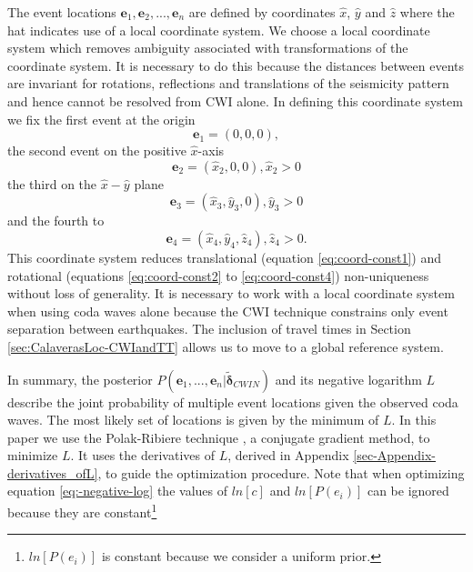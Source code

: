 \documentclass[extra, onecolumn, doublespacing]{gji}
\begin{document}
The event locations $\mathbf{e}_1, \mathbf{e}_2, ..., \mathbf{e}_n$
are defined by coordinates $\hat{x}$, $\hat{y}$ and $\hat{z}$ where
the hat indicates use of a local coordinate system. We choose a
local coordinate system which removes ambiguity associated with
transformations of the coordinate system. It is necessary to do this
because the distances between events are invariant for rotations,
reflections and translations of the seismicity pattern and hence
cannot be resolved from CWI alone. In defining this coordinate
system we fix the first event at the origin
\begin{equation}
\label{eq:coord-const1}
\mathbf{e}_1 = (0,0,0),
\end{equation}
the second event on the positive $\hat{x}$-axis
\begin{equation}
\label{eq:coord-const2}
\mathbf{e}_2 = (\hat{x}_2, 0, 0), \hat{x}_2>0
\end{equation}
the third on the $\hat{x}-\hat{y}$ plane
\begin{equation}
\label{eq:coord-const3}
\mathbf{e}_3 = (\hat{x}_3,\hat{y}_3,0), \hat{y}_3>0
\end{equation}
and the fourth to
\begin{equation}
\label{eq:coord-const4}
\mathbf{e}_4 = (\hat{x}_4,\hat{y}_4,\hat{z}_4), \hat{z}_4>0.
\end{equation}
This coordinate system reduces translational (equation \ref{eq:coord-const1})
and rotational (equations \ref{eq:coord-const2} to \ref{eq:coord-const4}) non-uniqueness
without loss of generality. It is necessary to work with a local coordinate
system when using coda waves alone because the CWI technique constrains only event separation
between earthquakes. The inclusion of travel times in Section \ref{sec:CalaverasLoc-CWIandTT}
allows us to move to a global reference system.

In summary, the posterior $P(\mathbf{e}_1,...,\mathbf{e}_n |
\widetilde{\mathbf{\delta}}_{CWIN})$ and its negative logarithm $L$
describe the joint probability of multiple event locations given the
observed coda waves. The most likely set of locations is given by
the minimum of $L$.   In this paper we use the Polak-Ribiere
technique \citep{dr_Press87a}, a conjugate gradient method, to
minimize $L$. It uses the derivatives of $L$, derived in Appendix
\ref{sec-Appendix-derivatives_ofL}, to guide the
optimization procedure. Note that when optimizing
equation \ref{eq:-negative-log} the values of $ln \left[ c \right]$
and $ln \left[ P(e_i) \right]$ can be ignored because they are
constant\footnote{$ln \left[ P(e_i) \right]$ is constant because we
consider a uniform prior.}
\end{document}
